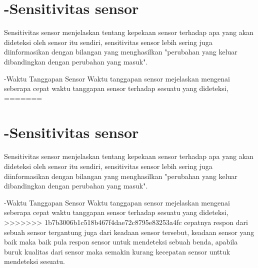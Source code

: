 \section{-Sensitivitas sensor}
Sensitivitas sensor menjelaskan tentang kepekaan sensor terhadap apa yang akan dideteksi oleh sensor itu sendiri,
sensitivitas sensor lebih sering juga diinformasikan dengan bilangan yang menghasilkan "perubahan yang keluar dibandingkan dengan perubahan yang masuk". 

-Waktu Tanggapan Sensor
Waktu tanggapan sensor mejelaskan mengenai seberapa cepat waktu tanggapan sensor terhadap sesuatu yang dideteksi,
=======
\section{-Sensitivitas sensor}
Sensitivitas sensor menjelaskan tentang kepekaan sensor terhadap apa yang akan dideteksi oleh sensor itu sendiri,
sensitivitas sensor lebih sering juga diinformasikan dengan bilangan yang menghasilkan "perubahan yang keluar dibandingkan dengan perubahan yang masuk". 

-Waktu Tanggapan Sensor
Waktu tanggapan sensor mejelaskan mengenai seberapa cepat waktu tanggapan sensor terhadap sesuatu yang dideteksi,
>>>>>>> 1b7b3006b1c518b467f4dae72c8795e83253a4fc
cepatnya respon dari sebuah sensor tergantung juga dari keadaan sensor tersebut, keadaan sensor yang baik maka baik pula respon sensor untuk mendeteksi sebuah benda, apabila buruk kualitas dari sensor maka semakin kurang kecepatan sensor unttuk mendeteksi sesuatu.